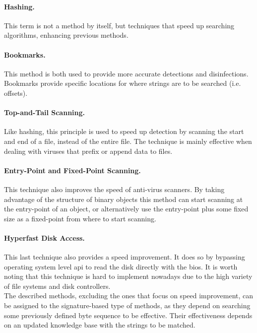 \documentclass{llncs}
\begin{document}
\paragraph{Hashing.} This term is not a method by itself, but techniques that speed up searching algorithms, enhancing previous methods.

\paragraph{Bookmarks.} This method is both used to provide more accurate detections and disinfections. Bookmarks provide specific locations for where strings are to be searched (i.e. offsets).

\paragraph{Top-and-Tail Scanning.} Like hashing, this principle is used to speed up detection by scanning the start and end of a file, instead of the entire file. The technique is mainly effective when dealing with viruses that prefix or append data to files.

\paragraph{Entry-Point and Fixed-Point Scanning.} This technique also improves the speed of anti-virus scanners. By taking advantage of the structure of binary objects this method can start scanning at the entry-point of an object, or alternatively use the entry-point plus some fixed size as a fixed-point from where to start scanning.

\paragraph{Hyperfast Disk Access.} This last technique also provides a speed improvement. It does so by bypassing operating system level \gls{api} to read the disk directly with the \gls{bios}. It is worth noting that this technique is hard to implement nowadays due to the high variety of file systems and disk controllers.\\

The described methods, excluding the ones that focus on speed improvement, can be assigned to the signature-based type of methods, as they depend on searching some previously defined byte sequence to be effective. Their effectiveness depends on an updated knowledge base with the strings to be matched.
\end{document}
